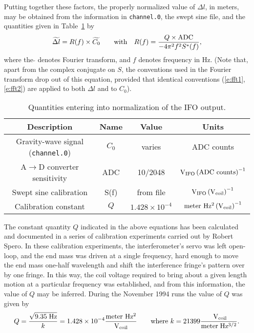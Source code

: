 Putting together these factors, the
properly normalized value of $\Delta l$, in meters, may be obtained
from the information in {\tt channel.0}, the swept sine file, and the
quantities given in Table~\ref{t:units} by
\begin{equation}
\label{e:rdef}
\widetilde{\Delta  l} = R(f) \times \widetilde{C_0 }  \qquad {\rm with } \quad
R(f) = {Q  \times {\rm ADC}  \over -4 \pi^2 f^2 S^*(f)},
\end{equation}
where the $\tilde {}$ denotes Fourier transform, and $f$ denotes
frequency in Hz.  (Note that, apart from the complex conjugate on $S$,
the conventions used in the Fourier transform drop out of this
equation, provided that identical conventions
(\ref{e:fft1},\ref{e:fft2}) are applied to both $\Delta l$ and to
$C_0$).
\begin{table}[h]
\caption{Quantities entering into normalization of the IFO output.}
\label{t:units}
\begin{center}
\begin{tabular}[]{c|c|c|c}
Description            & Name      &  Value                & Units \\
\hline
Gravity-wave signal ({\tt channel.0})   & $C_0$  &  varies               & ADC counts \\
\hline
A$\rightarrow$D converter sensitivity & ADC       &  10/2048              &    $ \rm V_{\rm IFO} \left({\rm ADC\ counts}\right)^{-1}      $ \\
\hline
Swept sine calibration & S(f)        &  from file            &  $   \rm V_{\rm IFO}  \left( V_{\rm coil}\right) ^{-1} $ \\
\hline
Calibration constant   &  $Q$      & $1.428\times 10^{-4}$ &  $ \rm meter\ Hz^2 \left(  V_{\rm coil} \right)^{-1} $
\end{tabular}
\end{center}
\end{table}
The constant quantity $Q$ indicated in the above equations has been
calculated and documented in a series of calibration experiments
carried out by Robert Spero. In these calibration experiments, the
interferometer's servo was left open-loop, and the end mass was driven at
a single frequency, hard enough to move the end mass one-half wavelength
and shift the interference fringe's pattern over by one fringe.  In this
way, the coil voltage required to bring about a given length motion at
a particular frequency was established, and from this information, the
value of $Q$ may be inferred.  During the November 1994 runs the value
of $Q$ was given by
\begin{equation}
Q = {\sqrt{9.35 \; \rm Hz} \over k} = 1.428 \times 10^{-4} {\rm
meter\ Hz^2 \over V_{\rm coil}} \qquad {\rm where\ } k=21399 {\rm
\ V_{\rm coil} \over meter \; Hz^{3/2}}.
\end{equation}


